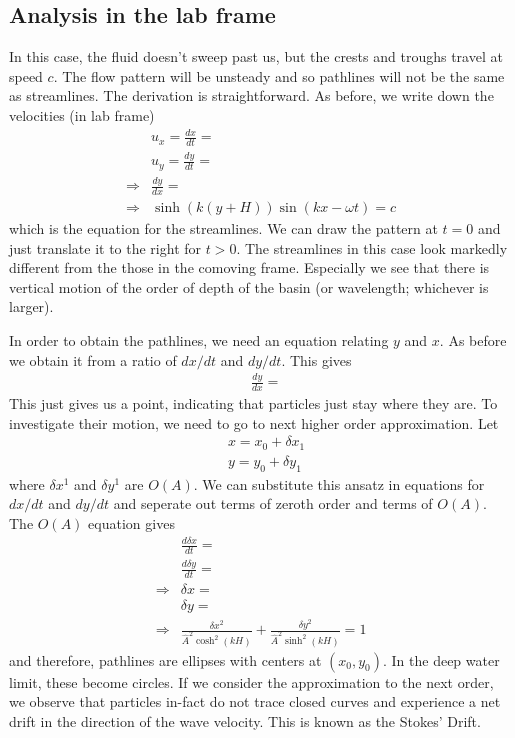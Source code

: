 \documentclass[11pt,a4paper]{article}
\newcommand{\dl}{\delta}
\newcommand{\1}{\vect{1}}
\newcommand{\ux}{u_x}
\newcommand{\uy}{u_y}
\newcommand{\RA}{\Rightarrow}
\begin{document}
\subsection{Analysis in the lab frame}

In this case, the fluid doesn't sweep past us, but the crests and troughs travel at speed $c$. The flow pattern will be unsteady and so pathlines will not be the same as streamlines. The derivation is straightforward. 
As before, we write down the velocities (in lab frame)
\begin{align*}
&\ux = \frac{dx}{dt} = \\
&\uy = \frac{dy}{dt} = \\
\RA& \frac{dy}{dx} = \\
\RA& \sinh(k(y+H))\sin(k x - \omega t) = c
\end{align*}
which is the equation for the streamlines. We can draw the pattern at $t=0$ and just translate it to the right for $t>0$. The streamlines in this case look markedly different from the those in the comoving frame.	Especially we see that there is vertical motion of the order of depth of the basin (or wavelength; whichever is larger). 

In order to obtain the pathlines, we need an equation relating $y$ and $x$. As before we obtain it from a ratio of $dx/dt$ and $dy/dt$. This gives
\begin{align*}
&\frac{dy}{dx} = 
\end{align*}
This just gives us a point, indicating that particles just stay where they are. To investigate their motion, we need to go to next higher order approximation. Let
\begin{align*}
&x = x_0 + \dl x_1\\
&y = y_0 + \dl y_1
\end{align*}
where $\dl x^1$ and $\dl y^1$ are $O(A)$. We can substitute this ansatz in equations for $dx/dt$ and $dy/dt$ and seperate out terms of zeroth order and terms of $O(A)$. The $O(A)$ equation gives
\begin{align*}
&\frac{d\dl x}{dt} = \\
&\frac{d\dl y}{dt} = \\
\RA& \dl x = \\
& \dl y = \\
\RA& \frac{\dl x^2}{\hat A^2 \cosh^2(kH)} + \frac{\dl y^2}{\hat A^2 \sinh^2(kH)} = 1
\end{align*}
and therefore, pathlines are ellipses with centers at $(x_0,y_0)$. In the deep water limit, these become circles. If we consider the approximation to the next order, we observe that particles in-fact do not trace closed curves and experience a net drift in the direction of the wave velocity. This is known as the Stokes' Drift.
\end{document}
